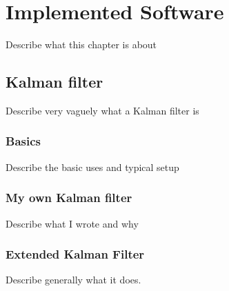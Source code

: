 \chapter{Implemented Software}\label{cha:ImplementedSoftware}

Describe what this chapter is about

\section{Kalman filter}
Describe very vaguely what a Kalman filter is

\subsection{Basics}
Describe the basic uses and typical setup

\subsection{My own Kalman filter}
Describe what I wrote and why

\subsection{Extended Kalman Filter}
Describe generally what it does.
